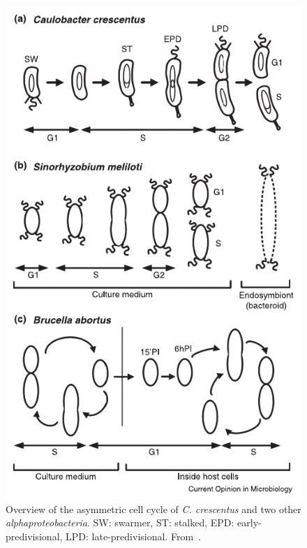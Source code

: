 \begin{figure}
    \centering
    \includegraphics{cell-cycle-overview}
    \caption{
        Overview of the asymmetric cell cycle of \textit{C. crescentus} and two other \textit{alphaproteobacteria}.
        SW: swarmer, ST: stalked, EPD: early-predivisional, LPD: late-predivisional.
        From~\cite{collier2016}.
        \label{fig:cell-cycle-overview}
     }
\end{figure}



